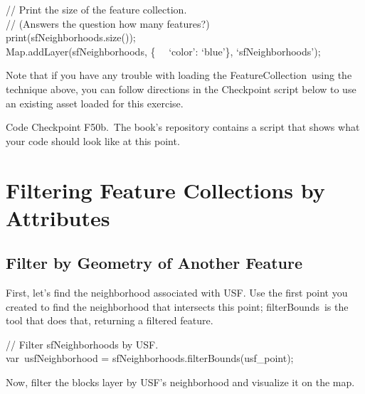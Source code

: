 \documentclass[
  letterpaper,
  DIV=11,
  numbers=noendperiod]{scrreprt}
\begin{document}
// Print the size of the feature collection.\\
// (Answers the question how many features?)\\
print(sfNeighborhoods.size());\\
Map.addLayer(sfNeighborhoods, \{~ ~`color': `blue'\},
`sfNeighborhoods');

Note that if you have any trouble with loading the
FeatureCollection~using the technique above, you can follow directions
in the Checkpoint script below to use an existing asset loaded for this
exercise.

\begin{tcolorbox}[enhanced jigsaw, left=2mm, breakable, rightrule=.15mm, opacityback=0, colframe=quarto-callout-note-color-frame, colbacktitle=quarto-callout-note-color!10!white, arc=.35mm, opacitybacktitle=0.6, toptitle=1mm, colback=white, leftrule=.75mm, title=\textcolor{quarto-callout-note-color}{\faInfo}\hspace{0.5em}{Note}, toprule=.15mm, bottomtitle=1mm, titlerule=0mm, bottomrule=.15mm, coltitle=black]

Code Checkpoint F50b.~The book's repository contains a script that shows
what your code should look like at this point.

\end{tcolorbox}

\hypertarget{filtering-feature-collections-by-attributes}{%
\section{Filtering Feature Collections by
Attributes}\label{filtering-feature-collections-by-attributes}}

\hypertarget{filter-by-geometry-of-another-feature}{%
\subsection{Filter by Geometry of Another
Feature}\label{filter-by-geometry-of-another-feature}}

First, let's find the neighborhood associated with USF. Use the first
point you created to find the neighborhood that intersects this point;
filterBounds~is the tool that does that, returning a filtered feature.

// Filter sfNeighborhoods by USF.\\
var~usfNeighborhood = sfNeighborhoods.filterBounds(usf\_point);

Now, filter the blocks layer by USF's neighborhood and visualize it on
the map.
\end{document}
